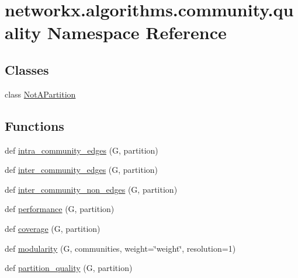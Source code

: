 \hypertarget{namespacenetworkx_1_1algorithms_1_1community_1_1quality}{}\section{networkx.\+algorithms.\+community.\+quality Namespace Reference}
\label{namespacenetworkx_1_1algorithms_1_1community_1_1quality}
\subsection*{Classes}
\begin{DoxyCompactItemize}
\item 
class \hyperlink{classnetworkx_1_1algorithms_1_1community_1_1quality_1_1NotAPartition}{Not\+A\+Partition}
\end{DoxyCompactItemize}
\subsection*{Functions}
\begin{DoxyCompactItemize}
\item 
def \hyperlink{namespacenetworkx_1_1algorithms_1_1community_1_1quality_a48ccd23eb0eba240ec55b00f6d7b5006}{intra\+\_\+community\+\_\+edges} (G, partition)
\item 
def \hyperlink{namespacenetworkx_1_1algorithms_1_1community_1_1quality_ade6588f07c2e51d6bb373430c4ad4505}{inter\+\_\+community\+\_\+edges} (G, partition)
\item 
def \hyperlink{namespacenetworkx_1_1algorithms_1_1community_1_1quality_afe1d1f49e54b5efb38d9c0a63c41f55f}{inter\+\_\+community\+\_\+non\+\_\+edges} (G, partition)
\item 
def \hyperlink{namespacenetworkx_1_1algorithms_1_1community_1_1quality_ad2ebe08be8ae2b1e4c905a9ec4e1ed8f}{performance} (G, partition)
\item 
def \hyperlink{namespacenetworkx_1_1algorithms_1_1community_1_1quality_ab0eedeeade4582947d360c52f29f29c3}{coverage} (G, partition)
\item 
def \hyperlink{namespacenetworkx_1_1algorithms_1_1community_1_1quality_ab4499bce41b3784f8a4fab8bffc17adc}{modularity} (G, communities, weight=\char`\"{}weight\char`\"{}, resolution=1)
\item 
def \hyperlink{namespacenetworkx_1_1algorithms_1_1community_1_1quality_aa9e2006990248b86a41d5e9f776cd3fc}{partition\+\_\+quality} (G, partition)
\end{DoxyCompactItemize}
